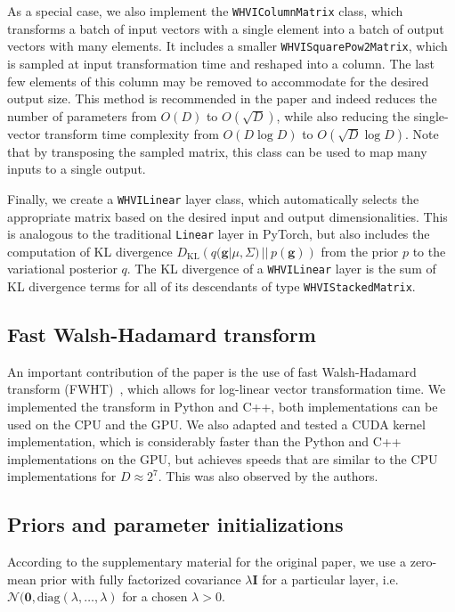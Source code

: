 As a special case, we also implement the \texttt{WHVIColumnMatrix} class, which transforms a batch of input vectors with a single element into a batch of output vectors with many elements.
It includes a smaller \texttt{WHVISquarePow2Matrix}, which is sampled at input transformation time and reshaped into a column.
The last few elements of this column may be removed to accommodate for the desired output size.
This method is recommended in the paper and indeed reduces the number of parameters from $O(D)$ to $O\left(\sqrt{D}\right)$, while also reducing the single-vector transform time complexity from $O(D\log D)$ to $O\left(\sqrt{D}\log D\right)$.
Note that by transposing the sampled matrix, this class can be used to map many inputs to a single output.

Finally, we create a \texttt{WHVILinear} layer class, which automatically selects the appropriate matrix based on the desired input and output dimensionalities.
This is analogous to the traditional \texttt{Linear} layer in PyTorch, but also includes the computation of KL divergence $D_\mathrm{KL}\left(q(\mathbf{g}|\mu, \Sigma)\, ||\, p(\mathbf{g})\right)$ from the prior $p$ to the variational posterior $q$.
The KL divergence of a \texttt{WHVILinear} layer is the sum of KL divergence terms for all of its descendants of type \texttt{WHVIStackedMatrix}.

\subsection{Fast Walsh-Hadamard transform}\label{subsec:fast-walsh-hadamard-transform}
An important contribution of the paper is the use of fast Walsh-Hadamard transform (FWHT)~\cite{fino1976unified}, which allows for log-linear vector transformation time.
We implemented the transform in Python and C++, both implementations can be used on the CPU and the GPU\@.
We also adapted and tested a CUDA kernel implementation, which is considerably faster than the Python and C++ implementations on the GPU, but achieves speeds that are similar to the CPU implementations for $D \approx 2^7$.
This was also observed by the authors.


\subsection{Priors and parameter initializations}\label{subsec:priors-and-parameter-initializations}
According to the supplementary material for the original paper, we use a zero-mean prior with fully factorized covariance $\lambda \mathbf{I}$ for a particular layer, i.e. $\mathcal{N}(\mathbf{0}, \mathrm{diag}(\lambda, \dots, \lambda)$ for a chosen $\lambda > 0$.

